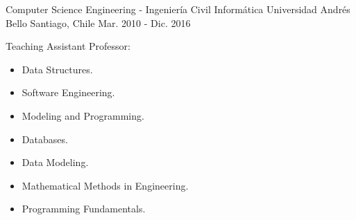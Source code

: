 

\begin{cventries}

  \cventry
    {Computer Science Engineering - Ingeniería Civil Informática} %
    {Universidad Andrés Bello} %
    {Santiago, Chile} %
    {Mar. 2010 - Dic. 2016} %
    {
     	\begin{cvitems} %
        	\item {Teaching Assistant Professor:}
        		\begin{itemize}
        			\item {Data Structures.}
	        		\item {Software Engineering.}
        			\item {Modeling and Programming.}
        			\item {Databases.}
        			\item {Data Modeling.}
        			\item {Mathematical Methods in Engineering.}
        			\item {Programming Fundamentals.}
      		\end{itemize}
    	\end{cvitems}
    }
     

\end{cventries}
